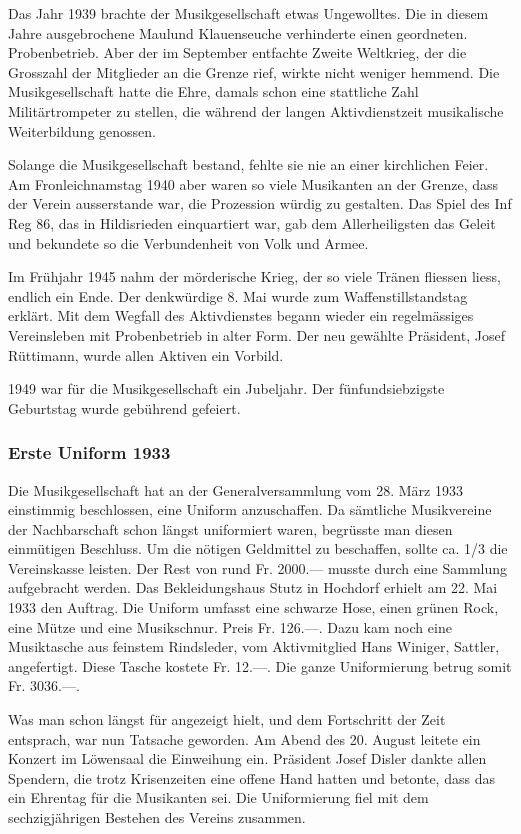 \begin{history}
    Das Jahr 1939 brachte der Musikgesellschaft etwas Ungewolltes. Die in diesem
    Jahre ausgebrochene Maulund Klauenseuche verhinderte einen geordneten.
    Probenbetrieb. Aber der im September entfachte Zweite Weltkrieg, der die
    Grosszahl der Mitglieder an die Grenze rief, wirkte nicht weniger hemmend.
    Die Musikgesellschaft hatte die Ehre, damals schon eine stattliche Zahl
    Militärtrompeter zu stellen, die während der langen Aktivdienstzeit
    musikalische Weiterbildung genossen.

    Solange die Musikgesellschaft bestand, fehlte sie nie an einer kirchlichen
    Feier. Am Fronleichnamstag 1940 aber waren so viele Musikanten an der
    Grenze, dass der Verein ausserstande war, die Prozession würdig zu
    gestalten. Das Spiel des Inf Reg 86, das in Hildisrieden einquartiert war,
    gab dem Allerheiligsten das Geleit und bekundete so die Verbundenheit von
    Volk und Armee.

    Im Frühjahr 1945 nahm der mörderische Krieg, der so viele Tränen fliessen
    liess, endlich ein Ende. Der denkwürdige 8. Mai wurde zum
    Waffenstillstandstag erklärt. Mit dem Wegfall des Aktivdienstes begann
    wieder ein regelmässiges Vereinsleben mit Probenbetrieb in alter Form. Der
    neu gewählte Präsident, Josef Rüttimann, wurde allen Aktiven ein Vorbild.

    1949 war für die Musikgesellschaft ein Jubeljahr. Der fünfundsiebzigste
    Geburtstag wurde gebührend gefeiert.

    \subsubsection{Erste Uniform 1933}

    Die Musikgesellschaft hat an der Generalversammlung vom 28. März 1933
    einstimmig beschlossen, eine Uniform anzuschaffen. Da sämtliche Musikvereine
    der Nachbarschaft schon längst uniformiert waren, begrüsste man diesen
    einmütigen Beschluss. Um die nötigen Geldmittel zu beschaffen, sollte ca.
    1/3 die Vereinskasse leisten. Der Rest von rund Fr. 2000.— musste durch eine
    Sammlung aufgebracht werden. Das Bekleidungshaus Stutz in Hochdorf erhielt
    am 22. Mai 1933 den Auftrag. Die Uniform umfasst eine schwarze Hose, einen
    grünen Rock, eine Mütze und eine Musikschnur. Preis Fr. 126.—. Dazu kam noch
    eine Musiktasche aus feinstem Rindsleder, vom Aktivmitglied Hans Winiger,
    Sattler, angefertigt. Diese Tasche kostete Fr. 12.—. Die ganze Uniformierung
    betrug somit Fr. 3036.—.

    Was man schon längst für angezeigt hielt, und dem Fortschritt der Zeit
    entsprach, war nun Tatsache geworden. Am Abend des 20. August leitete ein
    Konzert im Löwensaal die Einweihung ein. Präsident Josef Disler dankte allen
    Spendern, die trotz Krisenzeiten eine offene Hand hatten und betonte, dass
    das ein Ehrentag für die Musikanten sei. Die Uniformierung fiel mit dem
    sechzigjährigen Bestehen des Vereins zusammen.

\end{history}

